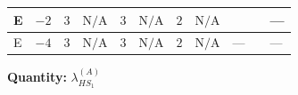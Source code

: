\documentclass[8pt]{article}
\begin{document}
\begin{landscape}
\begin{longtable}{@{}llcccccc >{\raggedright\arraybackslash}p{0.21\linewidth} >{\raggedright\arraybackslash}p{0.21\linewidth} >{\raggedright\arraybackslash}p{0.21\linewidth}@{}}
\midrule
E & $-2$ & $3$ & $\text{N/A}$ & $3$ & $\text{N/A}$ & $2$ & $\text{N/A}$ & \scriptsize\adjustbox{max width=\linewidth}{$\begin{gathered} -\frac{4}{3} {\lambda_{X_{12}}} \left({\lambda_{X_{12}}}\right)^{*}\end{gathered}$} & \scriptsize\adjustbox{max width=\linewidth}{$\begin{gathered} -\frac{33 {g_2}^2 {\lambda_{HS_1}^{(A)}}}{2}\end{gathered}$} & --- \\
\midrule
E & $-4$ & $3$ & $\text{N/A}$ & $3$ & $\text{N/A}$ & $2$ & $\text{N/A}$ & --- & \scriptsize\adjustbox{max width=\linewidth}{$\begin{gathered} -\frac{33 {g_2}^2 {\lambda_{HS_1}^{(A)}}}{2}\end{gathered}$} & --- \\
\midrule
\bottomrule
\end{longtable}
\clearpage
\noindent\textbf{Quantity: }$\lambda_{HS_1}^{(A)}$\par\smallskip

\end{landscape}
\end{document}
